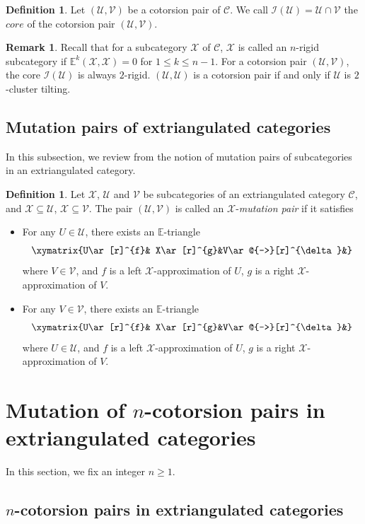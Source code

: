 \documentclass[a4paper,reqno,11pt]{amsart}
\theoremstyle{definition}
\newtheorem{definition}[theorem]{Definition}
\newtheorem{remark}[theorem]{Remark}
\def\C{\mathcal{C}}
\def\U{\mathcal{U}}
\def\X{\mathcal{X}}
\def\V{\mathcal{V}}
\def\I{\mathcal {I}}
\def\E{\mathbb{E}}
\begin{document}
\begin{definition}
Let $(\U, \V)$ be a cotorsion pair of $\C$. We call $\I(\U)=\U\cap\V$ the $core$ of the cotorsion pair $(\U, \V)$.
\end{definition}
\begin{remark}
Recall that for a subcategory $\X$ of $\C$, $\X$ is called an $n$-rigid subcategory if $\E^k(\X,\X)=0$ for $1\leq k\leq n-1$. For a cotorsion pair $(\U, \V)$, the core $\I(\U)$ is always $2$-rigid. $(\U, \U)$ is a cotorsion pair if and only if $\U$ is $2$-cluster tilting.
\end{remark}

\subsection{Mutation pairs of extriangulated categories}
In this subsection, we review from \cite{ZZ1} the notion of mutation pairs of subcategories in an extriangulated category.

\begin{definition}\cite[Definition 3.2]{ZZ1}\label{3}
Let $\X$, $\U$ and $\V$ be subcategories of an extriangulated category $\C$, and $\X\subseteq\U$, $\X\subseteq\V$. The pair $(\U, \V)$ is called an $\X$-\emph{mutation pair} if it satisfies
\begin{itemize}
  \item [(1)] For any $U\in\U$, there exists an $\E$-triangle
  $$\xymatrix{U\ar[r]^{f}& X\ar[r]^{g}&V\ar@{-->}[r]^{\delta}&}$$
  where $V\in\V$, and $f$ is a left $\X$-approximation of $U$, $g$ is a right $\X$-approximation of $V$.
  \item [(2)] For any $V\in\V$, there exists an $\E$-triangle
  $$\xymatrix{U\ar[r]^{f}& X\ar[r]^{g}&V\ar@{-->}[r]^{\delta}&}$$
  where $U\in\U$, and $f$ is a left $\X$-approximation of $U$, $g$ is a right $\X$-approximation of $V$.
\end{itemize}
\end{definition}

\vspace{2mm}

\section{Mutation of $n$-cotorsion pairs in extriangulated categories}
In this section, we fix an integer $n\geq 1$.

\subsection{$n$-cotorsion pairs in extriangulated categories}
\end{document}
